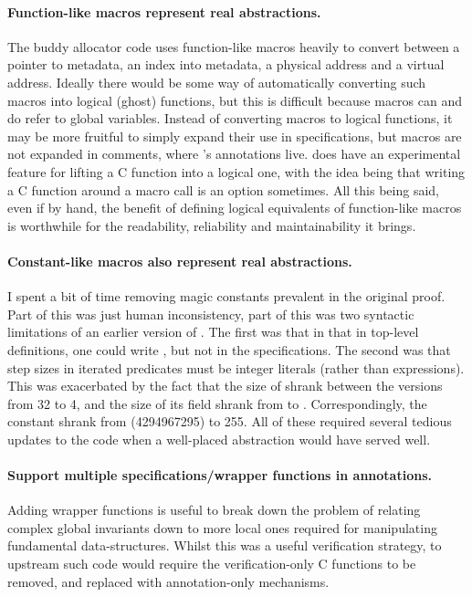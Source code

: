 \paragraph{Function-like macros represent real abstractions.} The buddy allocator code
uses function-like macros heavily to convert between a pointer to metadata, an
index into metadata, a physical address and a virtual address. Ideally there
would be some way of automatically converting such macros into logical (ghost)
functions, but this is difficult because macros can and do refer to global
variables. Instead of converting macros to logical functions, it may be more
fruitful to simply expand their use in specifications, but macros are not
expanded in comments, where 's annotations live.
 does have an experimental feature for lifting a C function into a
logical one, with the idea being that writing a C function around a macro call
is an option sometimes. All this being said, even if by hand, the benefit of
defining logical equivalents of function-like macros is worthwhile for the
readability, reliability and maintainability it brings.

\paragraph{Constant-like macros also represent real abstractions.} I spent a
bit of time removing magic constants prevalent in the original proof. Part of
this was just human inconsistency, part of this was two syntactic limitations
of an earlier version of . The first was that in that in top-level
definitions, one could write , but not in the
specifications. The second was that step sizes in iterated predicates must be
integer literals (rather than  expressions). This was
exacerbated by the fact that the size of  shrank
between the versions from 32 to 4, and the size of its  field
shrank from  to . Correspondingly, the constant
 shrank from  (4294967295) to 255. All
of these required several tedious updates to the code when a well-placed
abstraction would have served well.

\paragraph{Support multiple specifications/wrapper functions in annotations.}
Adding wrapper functions is useful to break down the problem of relating
complex global invariants down to more local ones required for manipulating
fundamental data-structures. Whilst this was a useful verification strategy, to
upstream such code would require the verification-only C functions to be
removed, and replaced with annotation-only mechanisms.

